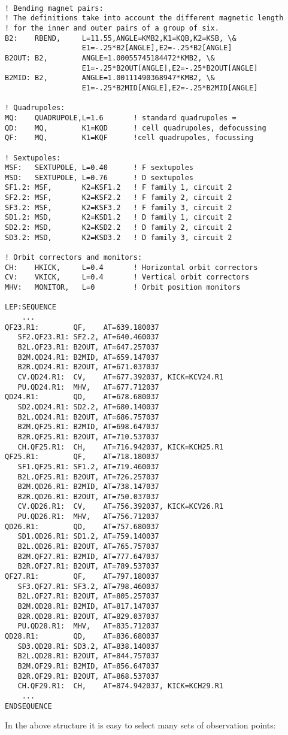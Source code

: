 \begin{verbatim}

! Bending magnet pairs:
! The definitions take into account the different magnetic length
! for the inner and outer pairs of a group of six.
B2:    RBEND,     L=11.55,ANGLE=KMB2,K1=KQB,K2=KSB, \&
                  E1=-.25*B2[ANGLE],E2=-.25*B2[ANGLE]
B2OUT: B2,        ANGLE=1.00055745184472*KMB2, \&
                  E1=-.25*B2OUT[ANGLE],E2=-.25*B2OUT[ANGLE]
B2MID: B2,        ANGLE=1.00111490368947*KMB2, \&
                  E1=-.25*B2MID[ANGLE],E2=-.25*B2MID[ANGLE]
 
! Quadrupoles:
MQ:    QUADRUPOLE,L=1.6       ! standard quadrupoles =
QD:    MQ,        K1=KQD      ! cell quadrupoles, defocussing
QF:    MQ,        K1=KQF      !cell quadrupoles, focussing
 
! Sextupoles:
MSF:   SEXTUPOLE, L=0.40      ! F sextupoles
MSD:   SEXTUPOLE, L=0.76      ! D sextupoles
SF1.2: MSF,       K2=KSF1.2   ! F family 1, circuit 2
SF2.2: MSF,       K2=KSF2.2   ! F family 2, circuit 2
SF3.2: MSF,       K2=KSF3.2   ! F family 3, circuit 2
SD1.2: MSD,       K2=KSD1.2   ! D family 1, circuit 2
SD2.2: MSD,       K2=KSD2.2   ! D family 2, circuit 2
SD3.2: MSD,       K2=KSD3.2   ! D family 3, circuit 2
 
! Orbit correctors and monitors:
CH:    HKICK,     L=0.4       ! Horizontal orbit correctors
CV:    VKICK,     L=0.4       ! Vertical orbit correctors
MHV:   MONITOR,   L=0         ! Orbit position monitors
 
LEP:SEQUENCE
    ... 
QF23.R1:        QF,    AT=639.180037
   SF2.QF23.R1: SF2.2, AT=640.460037
   B2L.QF23.R1: B2OUT, AT=647.257037
   B2M.QD24.R1: B2MID, AT=659.147037
   B2R.QD24.R1: B2OUT, AT=671.037037
   CV.QD24.R1:  CV,    AT=677.392037, KICK=KCV24.R1
   PU.QD24.R1:  MHV,   AT=677.712037
QD24.R1:        QD,    AT=678.680037
   SD2.QD24.R1: SD2.2, AT=680.140037
   B2L.QD24.R1: B2OUT, AT=686.757037
   B2M.QF25.R1: B2MID, AT=698.647037
   B2R.QF25.R1: B2OUT, AT=710.537037
   CH.QF25.R1:  CH,    AT=716.942037, KICK=KCH25.R1
QF25.R1:        QF,    AT=718.180037
   SF1.QF25.R1: SF1.2, AT=719.460037
   B2L.QF25.R1: B2OUT, AT=726.257037
   B2M.QD26.R1: B2MID, AT=738.147037
   B2R.QD26.R1: B2OUT, AT=750.037037
   CV.QD26.R1:  CV,    AT=756.392037, KICK=KCV26.R1
   PU.QD26.R1:  MHV,   AT=756.712037
QD26.R1:        QD,    AT=757.680037
   SD1.QD26.R1: SD1.2, AT=759.140037
   B2L.QD26.R1: B2OUT, AT=765.757037
   B2M.QF27.R1: B2MID, AT=777.647037
   B2R.QF27.R1: B2OUT, AT=789.537037
QF27.R1:        QF,    AT=797.180037
   SF3.QF27.R1: SF3.2, AT=798.460037
   B2L.QF27.R1: B2OUT, AT=805.257037
   B2M.QD28.R1: B2MID, AT=817.147037
   B2R.QD28.R1: B2OUT, AT=829.037037
   PU.QD28.R1:  MHV,   AT=835.712037
QD28.R1:        QD,    AT=836.680037
   SD3.QD28.R1: SD3.2, AT=838.140037
   B2L.QD28.R1: B2OUT, AT=844.757037
   B2M.QF29.R1: B2MID, AT=856.647037
   B2R.QF29.R1: B2OUT, AT=868.537037
   CH.QF29.R1:  CH,    AT=874.942037, KICK=KCH29.R1
    ... 
ENDSEQUENCE
\end{verbatim} In the above structure it is easy to select many sets of observation points: 

